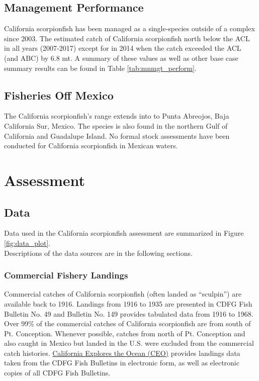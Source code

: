 \documentclass[12pt,]{article}
\begin{document}
\subsection{Management Performance}\label{management-performance-1}

California scorpionfish has been managed as a single-species outside of
a complex since 2003. The estimated catch of California scorpionfish
north below the ACL in all years (2007-2017) except for in 2014 when the
catch exceeded the ACL (and ABC) by 6.8 mt. A summary of these values as
well as other base case summary results can be found in Table
\ref{tab:mnmgt_perform}.

\subsection{Fisheries Off Mexico}\label{fisheries-off-mexico}

The California scorpionfish's range extends into to Punta Abreojos, Baja
California Sur, Mexico. The species is also found in the northern Gulf
of California and Guadalupe Island. No formal stock assessments have
been conducted for California scorpionfish in Mexican waters.

\section{Assessment}\label{assessment}

\subsection{Data}\label{data}

Data used in the California scorpionfish assessment are summarized in
Figure \ref{fig:data_plot}.\\
Descriptions of the data sources are in the following sections.

\subsubsection{Commercial Fishery
Landings}\label{commercial-fishery-landings}

Commercial catches of California scorpionfish (often landed as
``sculpin'') are available back to 1916. Landings from 1916 to 1935 are
presented in CDFG Fish Bulletin No. 49 and Bulletin No. 149 provides
tabulated data from 1916 to 1968. Over 99\% of the commercial catches of
California scorpionfish are from south of Pt. Conception. Whenever
possible, catches from north of Pt. Conception and also caught in Mexico
but landed in the U.S. were excluded from the commercial catch
histories.
\href{http://library.ucsd.edu/ceo/fishcatchtables/fish-catch-download.html}{California
Explores the Ocean (CEO)} provides landings data taken from the CDFG
Fish Bulletins in electronic form, as well as electronic copies of all
CDFG Fish Bulletins.
\end{document}
